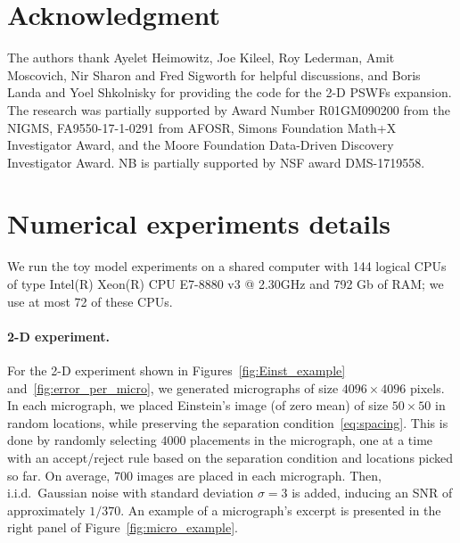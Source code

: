 \documentclass[12pt]{article}
\newcommand{\1}{\mathbf{1}}
\theoremstyle{plain}
\theoremstyle{definition}
\theoremstyle{remark}
\theoremstyle{plain}
\theoremstyle{remark}
\theoremstyle{plain}
\theoremstyle{plain}
\begin{document}
\section*{Acknowledgment}
The authors  thank Ayelet Heimowitz, Joe Kileel,  Roy Lederman, Amit Moscovich, Nir Sharon and  Fred Sigworth for helpful discussions,  and Boris Landa and Yoel Shkolnisky for providing the code for the 2-D PSWFs expansion.
The research was partially supported by Award Number R01GM090200 from the NIGMS, FA9550-17-1-0291 from AFOSR, Simons Foundation Math+X Investigator Award, and the Moore Foundation Data-Driven Discovery Investigator Award.
NB is partially supported by NSF award DMS-1719558.





\appendix



\section{Numerical experiments details} \label{sec:numeric_details}

We run the toy model experiments on a shared computer with 144 logical CPUs of type Intel(R) Xeon(R) CPU E7-8880 v3 @ 2.30GHz and 792 Gb of RAM; we use at most 72 of these CPUs.

\paragraph{2-D experiment.}
%

For the 2-D experiment shown in Figures~\ref{fig:Einst_example} and~\ref{fig:error_per_micro}, we generated micrographs of size $4096\times 4096$ pixels. 
In each micrograph, we placed Einstein's image (of zero mean) of size $50\times 50$  in random locations, while preserving the separation condition~\eqref{eq:spacing}.  
This is done by randomly selecting $4000$ placements in the micrograph, one at a time with
an accept/reject rule based on the separation condition and locations picked so far.
On average, $700$ images are placed in each micrograph.   
Then, i.i.d.\ Gaussian noise with standard deviation $\sigma=3$ is added, inducing an SNR of approximately $1/370$.
An example of a micrograph's excerpt is presented in the right panel of Figure~\ref{fig:micro_example}.
\end{document}
